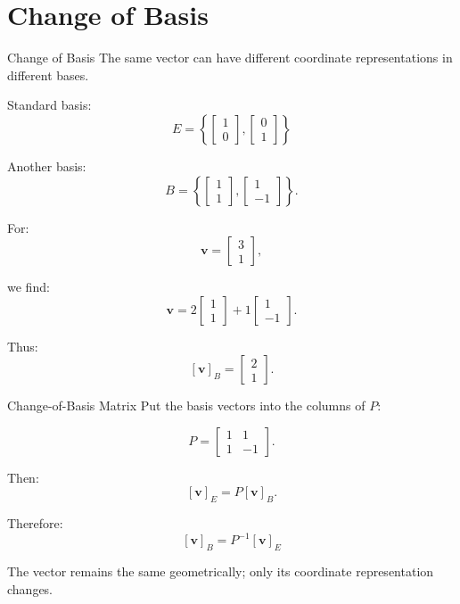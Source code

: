 \documentclass[aspectratio=169]{beamer}
\begin{document}
\section{Change of Basis}

\begin{frame}{Change of Basis}
The same vector can have different coordinate representations in different bases.

Standard basis:
\[
E=
\left\{
\begin{bmatrix}1\\0\end{bmatrix},
\begin{bmatrix}0\\1\end{bmatrix}
\right\}
\]

Another basis:
\[
B=
\left\{
\begin{bmatrix}1\\1\end{bmatrix},
\begin{bmatrix}1\\-1\end{bmatrix}
\right\}.
\]

For:
\[
\mathbf v=
\begin{bmatrix}3\\1\end{bmatrix},
\]

we find:
\[
\mathbf v=
2\begin{bmatrix}1\\1\end{bmatrix}
+
1\begin{bmatrix}1\\-1\end{bmatrix}.
\]

Thus:
\[
[\mathbf v]_B=
\begin{bmatrix}2\\1\end{bmatrix}.
\]
\end{frame}

\begin{frame}{Change-of-Basis Matrix}
Put the basis vectors into the columns of $P$:

\[
P=
\begin{bmatrix}
1&1\\
1&-1
\end{bmatrix}.
\]

Then:
\[
[\mathbf v]_E=P[\mathbf v]_B.
\]

Therefore:
\[
\boxed{
[\mathbf v]_B=P^{-1}[\mathbf v]_E
}
\]

The vector remains the same geometrically; only its coordinate representation changes.
\end{frame}
\end{document}
